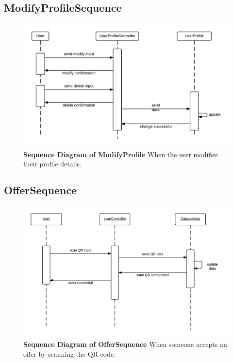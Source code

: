 \documentclass[]{article}
\begin{document}
\subsection{ModifyProfileSequence}

\begin{figure}[H]
\label{MPSeq}
	\centering
	\includegraphics[width=1\textwidth]{ModifyProfileSequence.png}
	\caption{\textbf{Sequence Diagram of ModifyProfile} When the user modifies their profile details.}
\end{figure}

\subsection{OfferSequence}

\begin{figure}[H]
\label{ofrSeq}
	\centering
	\includegraphics[width=1\textwidth]{OfferSequence.png}
	\caption{\textbf{Sequence Diagram of OfferSequence} When someone accepts an offer by scanning the QR code.}
\end{figure}
\end{document}
